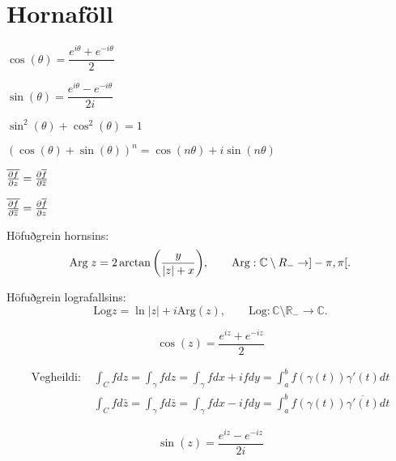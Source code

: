 \noindent
\section*{Hornaföll}

\begin{minipage}{.5\linewidth}
  $\cos(\theta) = \dfrac{e^{i \theta}+e^{-i\theta}}{2}$
\end{minipage}%
\begin{minipage}{.5\linewidth}
	$\sin(\theta) = \dfrac{e^{i \theta}-e^{-i\theta}}{2i}$
\end{minipage}

\begin{minipage}{.5\linewidth}
  $\sin^2(\theta) + \cos^2(\theta) =1$
\end{minipage}%
\begin{minipage}{.5\linewidth}
	$(\cos(\theta)+\sin(\theta))^n = \cos(n\theta)+i\sin(n\theta)$
\end{minipage}

\begin{minipage}{.5\linewidth}
	$\overline {{\frac{\partial f}{\partial z}}} = {\frac{\partial  \overline{f}}{\partial \overline z}}$
\end{minipage}%
\begin{minipage}{.5\linewidth}
	$\overline {{\frac{\partial f}{\partial \overline z}}} = {\frac{\partial \overline{f}}{\partial z}}$
\end{minipage}

\begin{minipage}{1\linewidth}
Höfuðgrein hornsins:
\begin{equation*}
  \text{Arg} \; z = 2 \arctan \bigg(\frac{y}{|z| + x} \biggl), \qquad
		  \text{Arg}: {\mathbb C} \setminus R_- \to ]-\pi,\pi[.
\end{equation*}
\end{minipage}
%
\begin{minipage}{1\linewidth}
\noindent Höfuðgrein lografallsins:
\begin{equation*}
      \text{Log} z = \ln |z| + i \text{Arg}(z), \qquad \text{Log}: \mathbb{C} \setminus \mathbb{R_{-}} \to \mathbb{C}.
\end{equation*}
\end{minipage}

\begin{equation*}
		\cos(z) = \frac{e^{iz}+e^{-iz}}2
\end{equation*}

\begin{minipage}{1\linewidth}
\begin{align*} \text{Vegheildi: }
&\int_C f dz = \int _{\gamma} fdz =\int_{\gamma}fdx+ ifdy = \int_{a}^{b} f(\gamma(t)) \gamma'(t)dt \\
&\int_C f d\bar{z} = \int _{\gamma} fd\bar{z} =\int_{\gamma}fdx - ifdy = \int_{a}^{b} f(\gamma(t)) \overline{\gamma'(t)}dt
\end{align*}
\end{minipage}



\begin{equation*}
		\sin(z) = \frac{e^{iz}-e^{-iz}}{2i}
\end{equation*}
